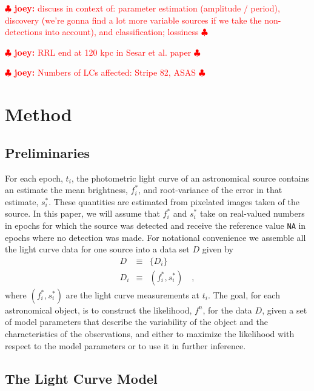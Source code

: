 \documentclass[12pt,preprint]{aastex}
\newcommand{\fobs}{f_i^*}
\newcommand{\sobs}{s_i^*}
\newcommand{\joey}[1] { \textcolor{red} {
\ensuremath{\clubsuit} {\bf joey:}  {#1}
\ensuremath{\clubsuit} } }%
\begin{document}
\joey{discuss in context of: parameter estimation (amplitude / period), discovery (we're gonna find a lot more variable sources if we take the non-detections into account), and classification; lossiness}

\joey{RRL end at 120 kpc in Sesar et al. paper}

\joey{Numbers of LCs affected: Stripe 82, ASAS}




\section{Method}
\label{sec:method}

\subsection{Preliminaries}
\label{ss:prelim}


For each epoch, $t_i$, the photometric light curve of an astronomical source contains an estimate the mean brightness, $\fobs$, and root-variance of the error in that estimate, $\sobs$.  These quantities are estimated from pixelated images taken of the source.   In this paper, we will assume that $\fobs$ and $\sobs$ take on real-valued numbers in epochs for which the source was detected and receive the reference value {\tt NA} in epochs where no detection was made. For notational convenience we assemble all the light curve data for one source into a data set $D$ given by
\begin{eqnarray}\displaystyle
D &\equiv& \{D_i\}
\\
D_i &\equiv& (\fobs, \sobs)
\quad ,
\end{eqnarray}
where $(\fobs, \sobs)$ are the light curve measurements  at $t_i$.  The goal, for each astronomical object, is to construct the likelihood, $f^n$, for the data $D$, given a set of model parameters that describe the variability of the object and the characteristics of the observations, and either to maximize the likelihood with respect to the model parameters or to use it in further inference.


\subsection{The Light Curve Model}
\end{document}

